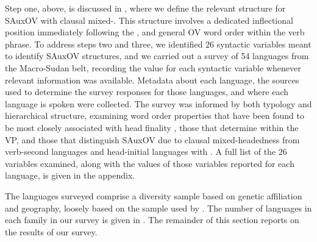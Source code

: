 \documentclass[output=paper,newtxmath,modfonts,nonflat,draftmode]{langsci/langscibook}
\begin{document}
Step one, above, is discussed in , where we define the relevant structure for SAuxOV with clausal mixed-. This structure involves a dedicated inflectional position immediately following the , and general OV word order within the verb phrase. To address steps two and three, we identified 26 syntactic variables meant to identify SAuxOV structures, and we carried out a survey of 54 languages from the Macro-Sudan belt, recording the value for each syntactic variable whenever relevant information was available. Metadata about each language, the sources used to determine the survey responses for those languages, and where each language is spoken were collected. The survey was informed by both typology and hierarchical structure, examining word order properties that have been found to be most closely associated with head finality \citep{dryer92, dryer07}, those that determine  within the VP, and those that distinguish SAuxOV due to clausal mixed-head\-ed\-ness  from verb-second languages and head-initial languages with . A full list of the 26 variables examined, along with the values of those variables reported for each language, is given in the appendix.

The languages surveyed comprise a diversity sample based on genetic affiliation and geography, loosely based on the sample used by \citet{clements08}. The number of languages in each family in our survey is given in . The remainder of this section reports on the results of our survey.
\end{document}
